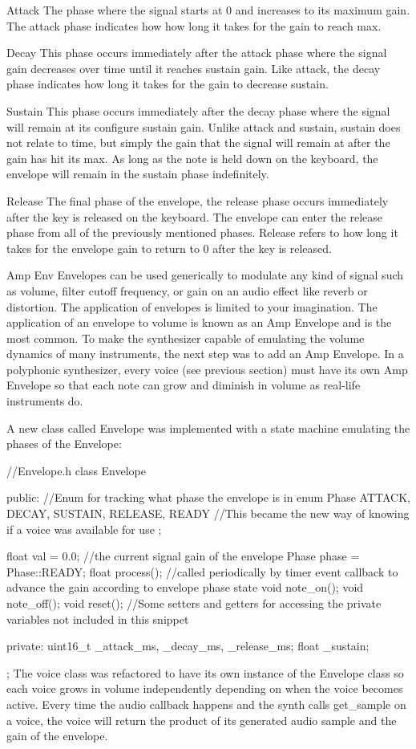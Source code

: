 \documentclass[acmlarge,screen]{acmart}
\begin{document}
Attack
The phase where the signal starts at 0 and increases to its maximum gain. The attack phase indicates how how long it takes for the gain to reach max.

Decay
This phase occurs immediately after the attack phase where the signal gain decreases over time until it reaches sustain gain. Like attack, the decay phase indicates how long it takes for the gain to decrease sustain.

Sustain
This phase occurs immediately after the decay phase where the signal will remain at its configure sustain gain. Unlike attack and sustain, sustain does not relate to time, but simply the gain that the signal will remain at after the gain has hit its max. As long as the note is held down on the keyboard, the envelope will remain in the sustain phase indefinitely.

Release
The final phase of the envelope, the release phase occurs immediately after the key is released on the keyboard. The envelope can enter the release phase from all of the previously mentioned phases. Release refers to how long it takes for the envelope gain to return to 0 after the key is released.

Amp Env
Envelopes can be used generically to modulate any kind of signal such as volume, filter cutoff frequency, or gain on an audio effect like reverb or distortion. The application of envelopes is limited to your imagination. The application of an envelope to volume is known as an Amp Envelope and is the most common. To make the synthesizer capable of emulating the volume dynamics of many instruments, the next step was to add an Amp Envelope. In a polyphonic synthesizer, every voice (see previous section) must have its own Amp Envelope so that each note can grow and diminish in volume as real-life instruments do.

A new class called Envelope was implemented with a state machine emulating the phases of the Envelope:

//Envelope.h
class Envelope {
	public:
	//Enum for tracking what phase the envelope is in
	enum Phase {
		ATTACK,
		DECAY,
		SUSTAIN,
		RELEASE,
		READY //This became the new way of knowing if a voice was available for use
	};
	
	float val = 0.0; //the current signal gain of the envelope
	Phase phase = Phase::READY;
	float process(); //called periodically by timer event callback to advance the gain according to envelope phase state
	void note_on();
	void note_off();
	void reset();
	//Some setters and getters for accessing the private variables not included in this snippet
	
	private:
	uint16_t _attack_ms, _decay_ms, _release_ms;
	float _sustain;
};
The voice class was refactored to have its own instance of the Envelope class so each voice grows in volume independently depending on when the voice becomes active. Every time the audio callback happens and the synth calls get_sample on a voice, the voice will return the product of its generated audio sample and the gain of the envelope.
\end{document}
